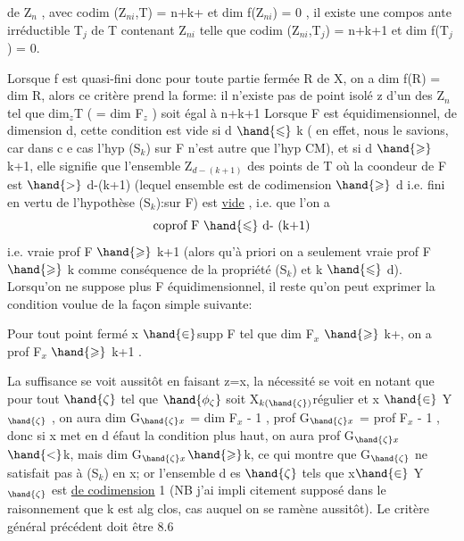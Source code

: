 
de Z$_n$ , avec codim (Z$_{ni}$,T) = n+k+ et dim f(Z$_{ni}$) = 0 , il existe
une compos ante irréductible T$_j$ de T contenant Z$_{ni}$ telle que
codim (Z$_{ni}$,T$_j$) = n+k+1 et dim f(T$_j$) = 0.

Lorsque f est quasi-fini donc pour toute partie fermée R de X,
on a dim f(R) = dim R, alors ce critère prend la forme: il n'existe 
pas de point isolé  z d'un des Z$_n$
  tel que dim$_z$T ( = dim F$_z$ ) soit égal à
n+k+1  Lorsque F est équidimensionnel, 
de dimension d,  cette condition
est vide si d $\hand{\leqslant}$ k ( en effet, nous le savions, car dans c e cas l'hyp
(S$_k$) sur F n'est autre que l'hyp CM), et si d $\hand{\geqslant}$ k+1, elle signifie
que l'ensemble Z$_{d - (k+1)}$ des points de T où la coondeur de F est
$\hand{>}$ d-(k+1) (lequel ensemble est de codimension $\hand{\geqslant}$ d i.e. fini en vertu de
l'hypothèse (S$_k$):sur F) est \uline{vide} , i.e. que 
l'on a 
\[ \text{coprof F } \hand{\leqslant} \text{ d- (k+1)} \]
i.e. vraie prof F $\hand{\geqslant}$ k+1
(alors qu'à priori on a seulement vraie prof F $\hand{\geqslant}$ k comme conséquence
de la propriété (S$_k$) et k $\hand{\leqslant}$ d). Lorsqu'on ne suppose plus F 
 équidimensionnel, il reste qu'on
peut exprimer la condition voulue de la façon simple suivante:

 Pour tout point fermé x $\hand{\in}$supp F tel que dim F$_x$ $\hand{\geqslant}$ k+, on a prof F$_x$ $\hand{\geqslant}$ k+1 .

La suffisance se voit aussitôt en faisant z=x, la nécessité se voit  en
notant que pour tout $\hand{\zeta}$ tel que $\hand{\phi_\zeta}$ soit X$_{k(\hand{\zeta})}$\hand{-}régulier et x $\hand{\in}$ Y$_{\hand{\zeta}}$ ,
on aura dim G$_{\hand{\zeta} x}$ = dim F$_x$ - 1 , prof G$_{\hand{\zeta} x}$ = prof F$_x$ - 1 , donc si
x met en d éfaut la condition plus haut, on aura prof G$_{\hand{\zeta} x}$ $\hand{<}$k, mais
dim G$_{\hand{\zeta} x}$$\hand{\geqslant}$k, ce qui montre que G$_{\hand{\zeta}}$ ne satisfait pas à (S$_k$) en x; or
l'ensemble d es $\hand{\zeta}$ tels que x$\hand{\in}$ Y$_{\hand{\zeta}}$ est \uline{de codimension} 1 (NB j'ai impli
\placedmargin{|} citement supposé dans le raisonnement que k est alg clos, cas auquel on
se ramène aussitôt). Le critère général précédent doit être   8.6
